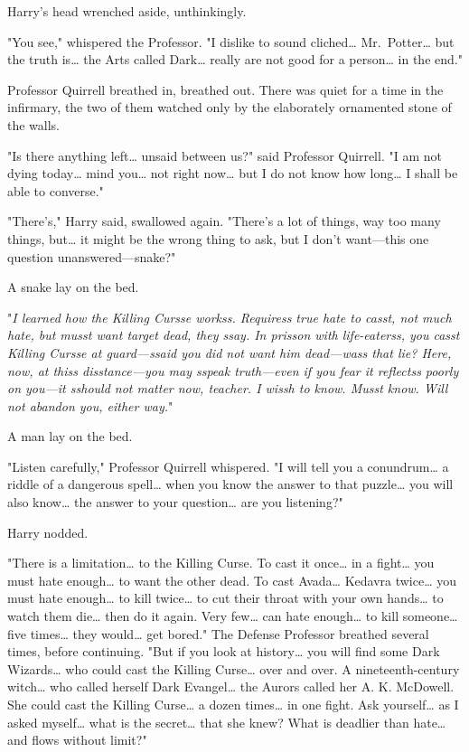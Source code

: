 Harry's head wrenched aside, unthinkingly.

"You see," whispered the Professor. "I dislike to sound cliched{\ldots} 
Mr.~Potter{\ldots} but the truth is{\ldots} the Arts called Dark{\ldots} really 
are not good for a person{\ldots} in the end."

Professor Quirrell breathed in, breathed out. There was quiet for a time in the 
infirmary, the two of them watched only by the elaborately ornamented stone of 
the walls.

"Is there anything left{\ldots} unsaid between us?" said Professor Quirrell. "I 
am not dying today{\ldots} mind you{\ldots} not right now{\ldots} but I do not 
know how long{\ldots} I shall be able to converse."

"There's," Harry said, swallowed again. "There's a lot of things, way too many 
things, but{\ldots} it might be the wrong thing to ask, but I don't want---this 
one question unanswered---snake?"

A snake lay on the bed.

"\emph{I learned how the Killing Cursse workss. Requiress true hate to casst, 
not much hate, but musst want target dead, they ssay. In prisson with 
life-eaterss, you casst Killing Cursse at guard---ssaid you did not want him 
dead---wass that lie? Here, now, at thiss disstance---you may sspeak 
truth---even if you fear it reflectss poorly on you---it sshould not matter 
now, teacher. I wissh to know. Musst know. Will not abandon you, either way.}"

A man lay on the bed.

"Listen carefully," Professor Quirrell whispered. "I will tell you a 
conundrum{\ldots} a riddle of a dangerous spell{\ldots} when you know the 
answer to that puzzle{\ldots} you will also know{\ldots} the answer to your 
question{\ldots} are you listening?"

Harry nodded.

"There is a limitation{\ldots} to the Killing Curse. To cast it once{\ldots} in 
a fight{\ldots} you must hate enough{\ldots} to want the other dead. To cast 
Avada{\ldots} Kedavra twice{\ldots} you must hate enough{\ldots} to kill 
twice{\ldots} to cut their throat with your own hands{\ldots} to watch them 
die{\ldots} then do it again. Very few{\ldots} can hate enough{\ldots} to kill 
someone{\ldots} five times{\ldots} they would{\ldots} get bored." The Defense 
Professor breathed several times, before continuing. "But if you look at 
history{\ldots} you will find some Dark Wizards{\ldots} who could cast the 
Killing Curse{\ldots} over and over. A nineteenth-century witch{\ldots} who 
called herself Dark Evangel{\ldots} the Aurors called her A. K. McDowell. She 
could cast the Killing Curse{\ldots} a dozen times{\ldots} in one fight. Ask 
yourself{\ldots} as I asked myself{\ldots} what is the secret{\ldots} that she 
knew? What is deadlier than hate{\ldots} and flows without limit?"

